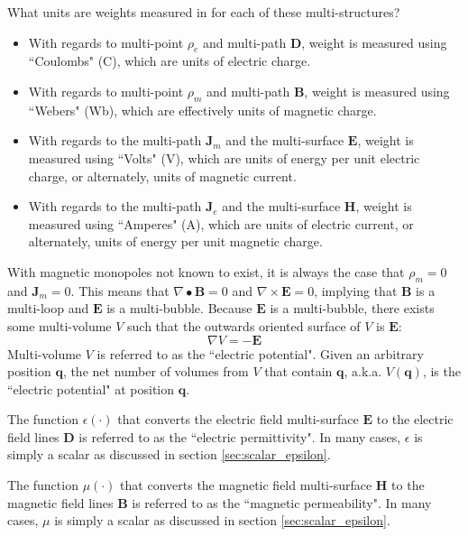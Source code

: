 \vspace{5mm}

What units are weights measured in for each of these multi-structures? 
\begin{itemize}
\item With regards to multi-point \(\rho_e\) and multi-path \(\mathbf{D}\), weight is measured using ``Coulombs" (C), which are units of electric charge. 
\item With regards to multi-point \(\rho_m\) and multi-path \(\mathbf{B}\), weight is measured using ``Webers" (Wb), which are effectively units of magnetic charge. 
\item With regards to the multi-path \(\mathbf{J}_m\) and the multi-surface \(\mathbf{E}\), weight is measured using ``Volts" (V), which are units of energy per unit electric charge, or alternately, units of magnetic current. 
\item With regards to the multi-path \(\mathbf{J}_e\) and the multi-surface \(\mathbf{H}\), weight is measured using ``Amperes" (A), which are units of electric current, or alternately, units of energy per unit magnetic charge. 
\end{itemize}

With magnetic monopoles not known to exist, it is always the case that \(\rho_m = 0\) and \(\mathbf{J}_m = 0\). This means that \(\nabla \bullet \mathbf{B} = 0\) and \(\nabla \times \mathbf{E} = 0\), implying that \(\mathbf{B}\) is a multi-loop and \(\mathbf{E}\) is a multi-bubble. Because \(\mathbf{E}\) is a multi-bubble, there exists some multi-volume \(V\) such that the outwards oriented surface of \(V\) is \(\mathbf{E}\):
\[\nabla V = -\mathbf{E}\]  
Multi-volume \(V\) is referred to as the ``electric potential". Given an arbitrary position \(\mathbf{q}\), the net number of volumes from \(V\) that contain \(\mathbf{q}\), a.k.a. \(V(\mathbf{q})\), is the ``electric potential" at position \(\mathbf{q}\).

The function \(\epsilon(\cdot)\) that converts the electric field multi-surface \(\mathbf{E}\) to the electric field lines \(\mathbf{D}\) is referred to as the ``electric permittivity". In many cases, \(\epsilon\) is simply a scalar as discussed in section \ref{sec:scalar_epsilon}.

The function \(\mu(\cdot)\) that converts the magnetic field multi-surface \(\mathbf{H}\) to the magnetic field lines \(\mathbf{B}\) is referred to as the ``magnetic permeability". In many cases, \(\mu\) is simply a scalar as discussed in section \ref{sec:scalar_epsilon}.





